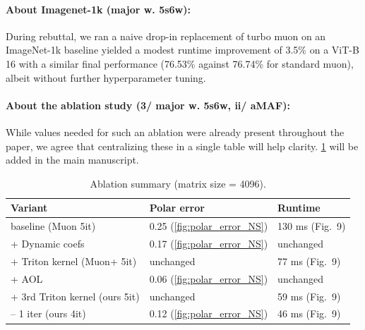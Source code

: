 \paragraph{About Imagenet-1k (major w. 5s6w):} 
During rebuttal, we ran a
naive drop-in replacement of turbo muon on an ImageNet-1k baseline yielded a modest runtime improvement of 3.5\% on a ViT-B 16 with a similar final performance (76.53\% against 76.74\% for standard muon), albeit without further hyperparameter tuning.

\vspace{-4mm}
\paragraph{About the ablation study (3/ major w. 5s6w, ii/ aMAF):} While values needed for such an ablation were already present throughout the paper, we agree that centralizing these in a single table will help clarity. \cref{tabl:ablation} will be added in the main manuscript.

    \begin{table}[h]
        \small
        \centering
        \label{tab:ablation_4096}
        \begin{tabular}{l l l}
            \toprule
            Variant & Polar error & Runtime \\
            \midrule
            baseline  (Muon 5it) & 0.25 (\cref{fig:polar_error_NS}) & 130 ms (Fig.~9) \\
            + Dynamic coefs  & 0.17 (\cref{fig:polar_error_NS}) & unchanged \\
            + Triton kernel (Muon+ 5it) & unchanged & 77 ms (Fig.~9) \\
            + AOL  & 0.06 (\cref{fig:polar_error_NS}) & unchanged\\ %
            + 3rd Triton kernel (ours 5it) & unchanged & 59 ms (Fig.~9) \\
            -- 1 iter (ours 4it) & 0.12 (\cref{fig:polar_error_NS}) & 46 ms (Fig.~9) \\
            \bottomrule
        \end{tabular}
        \caption{Ablation summary (matrix size = 4096).}%
        \label{tabl:ablation}
    \end{table}


